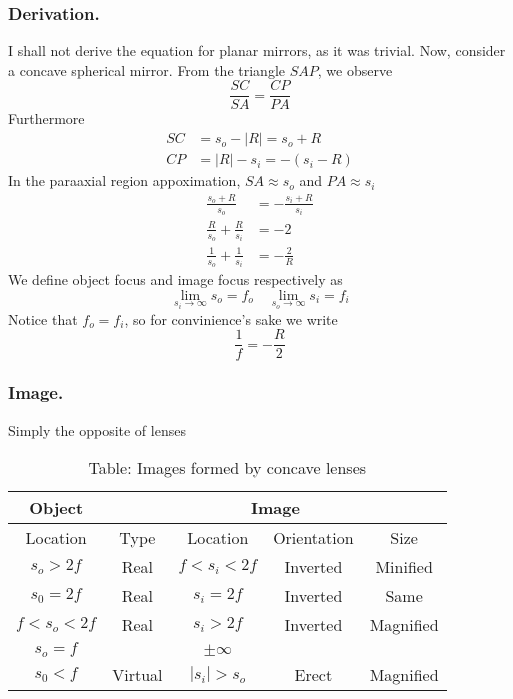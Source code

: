\documentclass[../../../main.tex]{subfiles}
\begin{document}
\subsubsection*{Derivation.}
I shall not derive the equation for planar mirrors, as it was trivial. Now, consider a concave spherical mirror. From the triangle $SAP$, we observe 
\begin{equation*}
    \frac{SC}{SA}=\frac{CP}{PA}
\end{equation*}
Furthermore
\begin{align*}
    SC&=s_o-|R|=s_o+R\\
    CP&=|R|-s_i=-(s_i-R)
\end{align*}
In the paraaxial region appoximation, $SA\approx s_o$ and $PA\approx s_i$
\begin{align*}
    \frac{s_o+R}{s_o}&=-\frac{s_i+R}{s_i}\\
    \frac{R}{s_o}+\frac{R}{s_i}&=-2\\
    \frac{1}{s_o}+\frac{1}{s_i}&=-\frac{2}{R}
\end{align*}
We define object focus and image focus respectively as 
\begin{equation*}
    \lim_{s_i\rightarrow\infty}s_o=f_o\quad\lim_{s_o\rightarrow\infty}s_i=f_i
\end{equation*}
Notice that $f_o=f_i$, so for convinience's sake we write 
\begin{equation*}
    \frac{1}{f}=-\frac{R}{2}
\end{equation*}

\subsubsection*{Image.} Simply the opposite of lenses 
\begin{table}
    \centering
    \caption*{Table: Images formed by concave lenses}
    \begin{tabular}{ccccc}
        \toprule
        Object & \multicolumn{4}{c}{Image}\\
        \midrule
        Location & Type & Location & Orientation & Size\\
        \midrule
        $s_o>2f$ &Real &$f<s_i<2f$ &Inverted &Minified \\
        $s_0=2f$ &Real &$s_i=2f$ &Inverted &Same \\
        $f<s_o<2f$ &Real &$s_i>2f$ &Inverted &Magnified \\
        $s_o=f$ & &$\pm \infty$ & & \\
        $s_0<f$ &Virtual &$|s_i|>s_o$ &Erect &Magnified \\
        \bottomrule
    \end{tabular}
\end{table}
\end{document}
